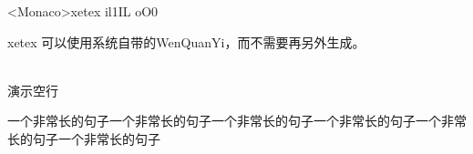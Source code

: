 \documentclass{article}
\begin{document}
<Monaco>xetex il1IL oO0

xetex 可以使用系统自带的WenQuanYi，而不需要再另外生成。

~\\

演示空行

一个非常长的句子一个非常长的句子一个非常长的句子一个非常长的句子一个非常长的句子一个非常长的句子
\end{document}
